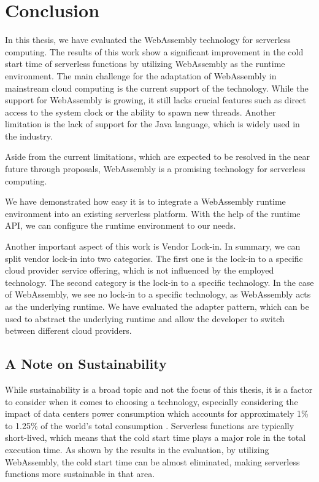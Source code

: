 \chapter{Conclusion}
\label{chap:conclusion}

In this thesis, we have evaluated the WebAssembly technology for serverless computing. The results of this work show a significant improvement in the cold start time of serverless functions by utilizing WebAssembly as the runtime environment. The main challenge for the adaptation of WebAssembly in mainstream cloud computing is the current support of the technology. While the support for WebAssembly is growing, it still lacks crucial features such as direct access to the system clock or the ability to spawn new threads. Another limitation is the lack of support for the Java language, which is widely used in the industry.

Aside from the current limitations, which are expected to be resolved in the near future through proposals, WebAssembly is a promising technology for serverless computing.

We have demonstrated how easy it is to integrate a WebAssembly runtime environment into an existing serverless platform. With the help of the runtime API, we can configure the runtime environment to our needs. 

Another important aspect of this work is Vendor Lock-in. In summary, we can split vendor lock-in into two categories. The first one is the lock-in to a specific cloud provider service offering, which is not influenced by the employed technology. The second category is the lock-in to a specific technology. In the case of WebAssembly, we see no lock-in to a specific technology, as WebAssembly acts as the underlying runtime. We have evaluated the adapter pattern, which can be used to abstract the underlying runtime and allow the developer to switch between different cloud providers.

\section{A Note on Sustainability}
\label{sec:sustainability}

While sustainability is a broad topic and not the focus of this thesis, it is a factor to consider when it comes to choosing a technology, especially considering the impact of data centers power consumption which accounts for approximately 1\% to 1.25\% of the world's total consumption \cite{patros2021sustainable}.
Serverless functions are typically short-lived, which means that the cold start time plays a major role in the total execution time. As shown by the results in the evaluation, by utilizing WebAssembly, the cold start time can be almost eliminated, making serverless functions more sustainable in that area. 
